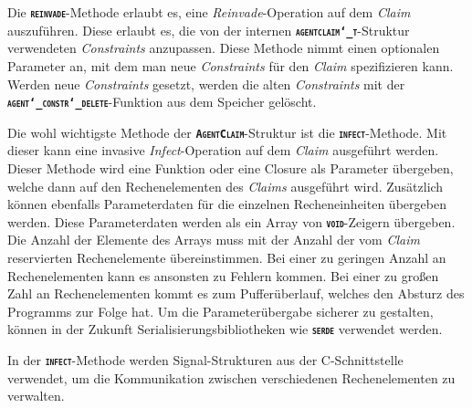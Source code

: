 Die \texttt{\textsc{\textbf{reinvade}}}-Methode erlaubt es, eine \textit{Reinvade}-Operation auf dem
\textit{Claim} auszuführen. Diese erlaubt es, die von der internen
\texttt{\textsc{\textbf{agentclaim\char`_t}}}-Struktur verwendeten \textit{Constraints} anzupassen.
Diese Methode nimmt einen optionalen Parameter an,
mit dem man neue \textit{Constraints} für den \textit{Claim} spezifizieren kann.
Werden neue \textit{Constraints} gesetzt, werden die alten \textit{Constraints} mit der
\texttt{\textsc{\textbf{agent\char`_constr\char`_delete}}}-Funktion aus dem Speicher gelöscht. 

Die wohl wichtigste Methode der \texttt{\textsc{\textbf{AgentClaim}}}-Struktur ist die
\texttt{\textsc{\textbf{infect}}}-Methode. Mit dieser kann eine invasive \textit{Infect}-Operation
auf dem \textit{Claim} ausgeführt werden.
Dieser Methode wird eine Funktion oder eine Closure als Parameter übergeben,
welche dann auf den Rechenelementen des \textit{Claims} ausgeführt wird.
Zusätzlich können ebenfalls Parameterdaten für die einzelnen Recheneinheiten übergeben werden.
Diese Parameterdaten werden als ein Array von \texttt{\textsc{\textbf{void}}}-Zeigern übergeben.
Die Anzahl der Elemente des Arrays muss mit der Anzahl der vom \textit{Claim} reservierten Rechenelemente 
übereinstimmen. Bei einer zu geringen Anzahl an Rechenelementen kann es ansonsten zu Fehlern kommen.
Bei einer zu großen Zahl an Rechenelementen kommt es zum Pufferüberlauf, welches den Absturz des Programms zur
Folge hat. Um die Parameterübergabe sicherer zu gestalten, können in der Zukunft Serialisierungsbibliotheken
wie \texttt{\textsc{\textbf{serde}}} verwendet werden.

In der \texttt{\textsc{\textbf{infect}}}-Methode werden Signal-Strukturen aus der C-Schnittstelle verwendet,
um die Kommunikation zwischen verschiedenen Rechenelementen zu verwalten.


